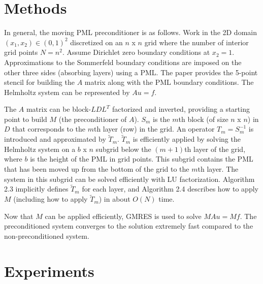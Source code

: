 \documentclass[11pt]{article}
\begin{document}
\section{Methods}
In general, the moving PML preconditioner is as follows.
Work in the 2D domain $(x_1, x_2) \in (0,1)^2$ discretized on an $n$ x $n$ grid where the number 
of interior grid points $N=n^2$. 
Assume Dirichlet zero boundary conditions at $x_2=1$. Approximations to the Sommerfeld 
boundary conditions are imposed on the other three sides (absorbing layers) using a PML. 
The paper provides the 5-point stencil for building the $A$ matrix along with the
PML boundary conditions. The Helmholtz system can be represented by $Au=f$.

The $A$ matrix can be block-$LDL^T$ factorized and inverted, providing a starting point to 
build $M$ (the preconditioner of $A$).
$S_m$ is the $m$th block (of size $n$ x $n$) in $D$ that corresponds to the $m$th layer (row) in the grid. 
An operator $T_m=S_m^{-1}$ is introduced and approximated by $\tilde{T}_m$. 
$\tilde{T}_m$ is efficiently applied by solving the Helmholtz system on a $b$ x $n$ 
subgrid below the $(m+1)$th layer of the grid, where $b$ is the height of the PML in grid points. 
This subgrid contains the 
PML that has been moved up from the bottom of the grid to the $m$th layer. The system
in this subgrid can be solved efficiently with LU factorization.  
Algorithm 2.3 implicitly defines $\tilde{T}_m$ for each layer, and Algorithm 2.4 describes how to apply $M$ (including how to apply $\tilde{T}_m$) in about $O(N)$ time. 

Now that $M$ can be applied efficiently, GMRES is used to solve $MAu=Mf$. The preconditioned system
converges to the solution extremely fast compared to the non-preconditioned system.

\section{Experiments}
\end{document}

